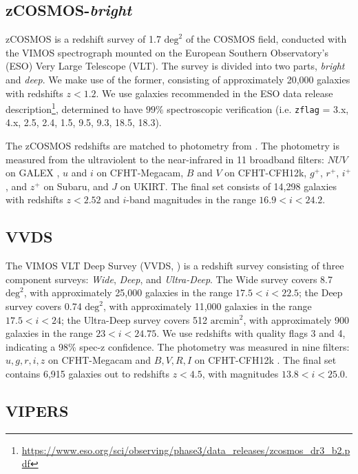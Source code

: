 \medskip
\subsection{zCOSMOS-\textit{bright}}

zCOSMOS \citep{Lilly2009a} is a redshift survey of 1.7 $\text{deg}^2$ of the COSMOS field, conducted with the VIMOS spectrograph mounted on the European Southern Observatory's (ESO) Very Large Telescope (VLT).
The survey is divided into two parts, \textit{bright} and \textit{deep}. 
We make use of the former, consisting of approximately 20,000 galaxies with redshifts $z < 1.2$.
We use galaxies recommended in the ESO data release description\footnote{\url{https://www.eso.org/sci/observing/phase3/data_releases/zcosmos_dr3_b2.pdf}}, determined to have $99\%$ spectroscopic verification (i.e. \texttt{zflag} = 3.x, 4.x, 2.5, 2.4, 1.5, 9.5, 9.3, 18.5, 18.3).

The zCOSMOS redshifts are matched to photometry from \citet{Ilbert2009}.
The photometry is measured from the ultraviolent to the near-infrared in 11 broadband filters: $NUV$ on GALEX \citep{Martin2005a}, $u$ and $i$ on CFHT-Megacam, $B$ and $V$ on CFHT-CFH12k, $g^+$, $r^+$, $i^+$, and $z^+$ on Subaru, and $J$ on UKIRT.
The final set consists of 14,298 galaxies with redshifts $z < 2.52$ and $i$-band magnitudes in the range $16.9 < i < 24.2$.

\subsection{VVDS}

The VIMOS VLT Deep Survey (VVDS, \citealt{LeFevre2013b}) is a redshift survey consisting of three component surveys: \textit{Wide}, \textit{Deep}, and \textit{Ultra-Deep}. 
The Wide survey covers 8.7 $\text{deg}^2$, with approximately 25,000 galaxies in the range $17.5 < i < 22.5$; the Deep survey covers 0.74 $\text{deg}^2$, with approximately 11,000 galaxies in the range $17.5 < i < 24$; the Ultra-Deep survey covers 512 $\text{arcmin}^2$, with approximately 900 galaxies in the range $23 < i < 24.75$.
We use redshifts with quality flags 3 and 4, indicating a 98\% spec-z confidence.
The photometry was measured in nine filters: $u,g,r,i,z$ on CFHT-Megacam \citep{Hudelot2012} and $B,V,R,I$ on CFHT-CFH12k \citep{LeFevre2004}.
The final set contains 6,915 galaxies out to redshifts $z < 4.5$, with magnitudes $ 13.8 < i < 25.0$.

\subsection{VIPERS}

